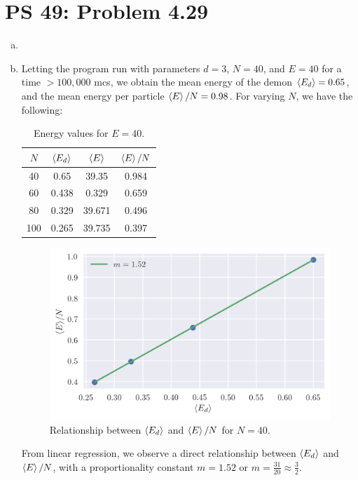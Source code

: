\documentclass[12pt,a4paper,twocolumn]{article}
\begin{document}
\setcounter{page}{1}

\section*{PS 49: Problem 4.29}
\bigskip

\begin{enumerate}[(a)]

\item

\item Letting the program run with parameters $d = 3$, $N = 40$, and $E = 40$ for a time $> 100,000$ mcs, we obtain the mean energy of the demon $\ev{E_d} = 0.65$, and the mean energy per particle $\ev{E}/N = 0.98$. For varying $N$, we have the following:

\begin{table}[h!]
	\centering
	\caption{Energy values for $E = 40$.}
	\begin{tabular}{|c|c|c|c|}
		\hline
		$N$ & $\ev{E_d}$ & $\ev{E}$ & $\ev{E}/N$ \\ \hline
		40 & 0.65 & 39.35 & 0.984 \\
		60 & 0.438 & 0.329 & 0.659 \\
		80 & 0.329 & 39.671 & 0.496 \\
		100 & 0.265 & 39.735 & 0.397 \\ \hline
	\end{tabular}
	\label{tab:E=40}
\end{table}

\begin{figure}[h!]
	\centering
	\includegraphics[width=\linewidth]{E=40.png}
	\caption{Relationship between $\ev{E_d}$ and $\ev{E}/N$ for $N=40$.}
	\label{fig:E=40}
\end{figure}

From linear regression, we observe a direct relationship between $\ev{E_d}$ and $\ev{E}/N$, with a proportionality constant $m = 1.52$ or $m = \frac{31}{20} \approx \frac{3}{2}$.

\end{enumerate}
\end{document}
